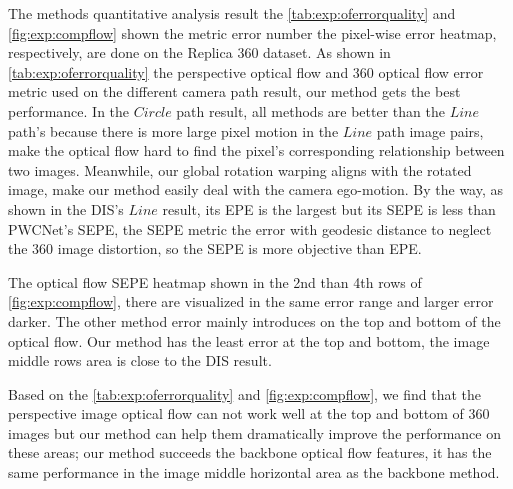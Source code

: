 The methods quantitative analysis result the \cref{tab:exp:oferrorquality} and \cref{fig:exp:compflow} shown the metric error number the pixel-wise error heatmap, respectively, are done on the Replica 360 dataset. 
As shown in \cref{tab:exp:oferrorquality} the perspective optical flow and 360 optical flow error metric used on the different camera path result, our method gets the best performance.
%
In the $Circle$ path result, all methods are better than the $Line$ path's because there is more large pixel motion in the $Line$ path image pairs, make the optical flow hard to find the pixel's corresponding relationship between two images. Meanwhile, our global rotation warping aligns with the rotated image, make our method easily deal with the camera ego-motion.
By the way, as shown in the DIS's $Line$ result, its EPE is the largest but its SEPE is less than PWCNet's SEPE, 
the SEPE metric the error with geodesic distance to neglect the 360 image distortion, so the SEPE is more objective than EPE.

The optical flow SEPE heatmap shown in the 2nd than 4th rows of \cref{fig:exp:compflow}, there are visualized in the same error range and larger error darker.
The other method error mainly introduces on the top and bottom of the optical flow.
Our method has the least error at the top and bottom, the image middle rows area is close to the DIS result. 

Based on the \cref{tab:exp:oferrorquality} and \cref{fig:exp:compflow}, we find that 
%
the perspective image optical flow can not work well at the top and bottom of 360 images but our method can help them dramatically improve the performance on these areas;
%
our method succeeds the backbone optical flow features, it has the same performance in the image middle horizontal area as the backbone method.



